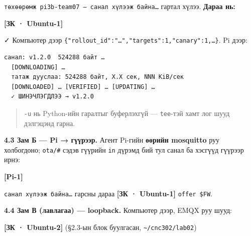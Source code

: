 \texttt{төхөөрөмж\ pi3b-team07\ —\ санал\ хүлээж\ байна\ldots{}} гартал хүлээ. \textbf{Дараа нь:}

\textbf{{[}ЗК · Ubuntu-1{]}}

\begin{Shaded}
\begin{Highlighting}[]
 
\end{Highlighting}
\end{Shaded}

✓ Компьютер дээр \texttt{\{"rollout\_\allowbreak{}id":\allowbreak{}"\ldots{}","targets":\allowbreak{}1,"canary":\allowbreak{}1,\ldots{}\}}. Pi дээр:

\begin{verbatim}
санал: v1.2.0  524288 байт …
  [DOWNLOADING] …
  татаж дууслаа: 524288 байт, X.X сек, NNN KiB/сек
  [DOWNLOADED] … [VERIFIED] … [UPDATING] …
  ✓ ШИНЭЧЛЭГДЛЭЭ → v1.2.0
\end{verbatim}

\begin{quote}
\texttt{-u} нь Python-ийн гаралтыг буферлэхгүй --- \texttt{tee}-тэй хамт лог шууд дэлгэцэнд гарна.
\end{quote}

\textbf{4.3 Зам Б --- Pi → гүүрээр.} Агент Pi-гийн \textbf{өөрийн mosquitto} руу холбогдоно; \texttt{ota/\#} сэдэв гүүрийн \texttt{in} дүрэмд бий тул санал ба хэсгүүд гүүрээр ирнэ:

\textbf{{[}Pi-1{]}}

\begin{Shaded}
\begin{Highlighting}[]
 \KeywordTok{|} 
\end{Highlighting}
\end{Shaded}

\texttt{санал\ хүлээж\ байна\ldots{}} гарсны дараа \textbf{{[}ЗК · Ubuntu-1{]}} \texttt{offer\ \$FW}.

\textbf{4.4 Зам В (лавлагаа) --- loopback.} Компьютер дээр, EMQX руу шууд:

\textbf{{[}ЗК · Ubuntu-2{]}} (§2.3-ын блок буулгасан, \texttt{\textasciitilde{}/cnc302/lab02})

\begin{Shaded}
\begin{Highlighting}[]
\KeywordTok{|} 
\end{Highlighting}
\end{Shaded}

